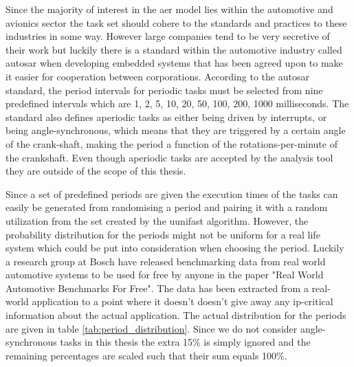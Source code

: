 \documentclass{kththesis}
\begin{document}
Since the majority of interest in the \acrshort{aer} model lies within the automotive and avionics
sector the task set should cohere to the standards and practices to these industries in some way.
However large companies tend to be very secretive of their work but luckily there is a standard
within the automotive industry called \acrshort{autosar} when developing embedded systems that has
been agreed upon to make it easier for cooperation between corporations. According to the
\acrshort{autosar} standard, the period intervals for periodic tasks must be selected from nine
predefined intervals which are 1, 2, 5, 10, 20, 50, 100, 200, 1000 milliseconds. The standard also
defines aperiodic tasks as either being driven by interrupts, or being angle-synchronous, which
means that they are triggered by a certain angle of the crank-shaft, making the period a function of
the rotations-per-minute of the crankshaft. Even though aperiodic tasks are accepted by the analysis
tool they are outside of the scope of this thesis.

Since a set of predefined periods are given the execution times of the tasks can easily be generated
from randomising a period and pairing it with a random utilization from the set created by the
uunifast algorithm. However, the probability distribution for the periods might not be uniform for a
real life system which could be put into consideration when choosing the period. Luckily a research
group at Bosch have released benchmarking data from real world automotive systems to be used for
free by anyone in the paper "Real World Automotive Benchmarks For Free"\parencite{kramer_real_2015}.
The data has been extracted from a real-world application to a point where it doesn't doesn't give
away any \acrshort{ip}-critical information about the actual application. The actual distribution
for the periods are given in table \ref{tab:period_distribution}. Since we do not consider
angle-synchronous tasks in this thesis the extra 15\% is simply ignored and the remaining
percentages are scaled such that their sum equals 100\%. 
\end{document}
